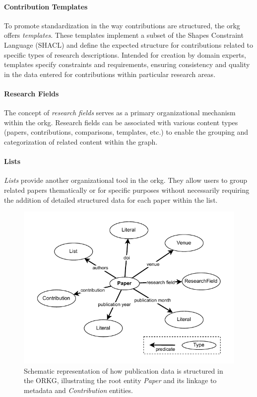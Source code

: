 \paragraph{Contribution Templates} To promote standardization in the way contributions are structured, the \gls{orkg} offers \emph{templates}. These templates implement a subset of the Shapes Constraint Language (SHACL) \cite{knublauch_shapes_2017} and define the expected structure for contributions related to specific types of research descriptions. Intended for creation by domain experts, templates specify constraints and requirements, ensuring consistency and quality in the data entered for contributions within particular research areas. \cite[58-60]{ilangovan_open_2024}

\paragraph{Research Fields} The concept of \emph{research fields} serves as a primary organizational mechanism within the \gls{orkg}. Research fields can be associated with various content types (papers, contributions, comparisons, templates, etc.) to enable the grouping and categorization of related content within the graph. \cite[29-30]{ilangovan_open_2024}

\paragraph{Lists} \emph{Lists} provide another organizational tool in the \gls{orkg}. They allow users to group related papers thematically or for specific purposes without necessarily requiring the addition of detailed structured data for each paper within the list. \cite[28-29]{ilangovan_open_2024}

\begin{figure}
    \centering
    \includegraphics[width=0.7\linewidth]{figures/orkg/figures-orkg_structure.drawio.pdf}
    \caption[Schematic Representation of ORKG Publication Data]{Schematic representation of how publication data is structured in the ORKG, illustrating the root entity \emph{Paper} and its linkage to metadata and \emph{Contribution} entities.}
    \label{fig:orkg_structure}
\end{figure}

